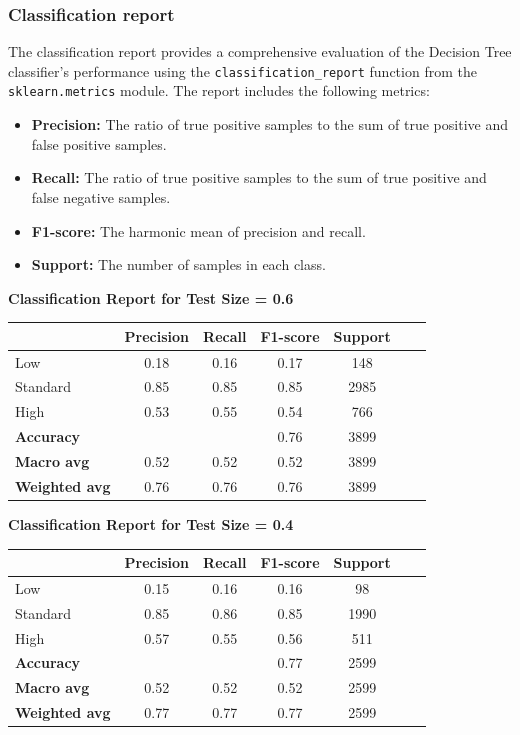 \subsubsection{Classification report}

The classification report provides a comprehensive evaluation of the Decision Tree classifier's performance using the \texttt{classification\_report} function from the \texttt{sklearn.metrics} module. The report includes the following metrics:
\begin{itemize}
    \item \textbf{Precision:} The ratio of true positive samples to the sum of true positive and false positive samples.
    \item \textbf{Recall:} The ratio of true positive samples to the sum of true positive and false negative samples.
    \item \textbf{F1-score:} The harmonic mean of precision and recall.
    \item \textbf{Support:} The number of samples in each class.
\end{itemize}

\textbf{Classification Report for Test Size = 0.6}

\begin{tabular}{lcccccc}
\hline
 & \textbf{Precision} & \textbf{Recall} & \textbf{F1-score} & \textbf{Support} \\
\hline
Low & 0.18 & 0.16 & 0.17 & 148 \\
Standard & 0.85 & 0.85 & 0.85 & 2985 \\
High & 0.53 & 0.55 & 0.54 & 766 \\
\hline
\textbf{Accuracy} & & & 0.76 & 3899 \\
\textbf{Macro avg} & 0.52 & 0.52 & 0.52 & 3899 \\
\textbf{Weighted avg} & 0.76 & 0.76 & 0.76 & 3899 \\
\hline
\end{tabular}

\vspace{2em}

\textbf{Classification Report for Test Size = 0.4}

\begin{tabular}{lcccccc}
\hline
 & \textbf{Precision} & \textbf{Recall} & \textbf{F1-score} & \textbf{Support} \\
\hline
Low & 0.15 & 0.16 & 0.16 & 98 \\
Standard & 0.85 & 0.86 & 0.85 & 1990 \\
High & 0.57 & 0.55 & 0.56 & 511 \\
\hline
\textbf{Accuracy} & & & 0.77 & 2599 \\
\textbf{Macro avg} & 0.52 & 0.52 & 0.52 & 2599 \\
\textbf{Weighted avg} & 0.77 & 0.77 & 0.77 & 2599 \\
\hline
\end{tabular}


